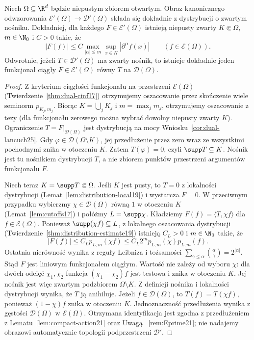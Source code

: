 \begin{twierdzenie}
\label{thm:compact-support-E25}
Niech $\Omega\subseteq\R^d$ będzie niepustym zbiorem otwartym.
Obraz kanonicznego odwzorowania
$\mathcal E'(\Omega)\to\mathcal D'(\Omega)$
składa się dokładnie z dystrybucji o zwartym nośniku.
Dokładniej, dla każdego $F\in\mathcal E'(\Omega)$ istnieją
niepusty zwarty $K\Subset\Omega$, $m\in\N_0$ i $C>0$ takie, że
\[
 |F(f)|\le C\max_{|\alpha|\le m}\sup_{x\in K}
 |\partial^\alpha f(x)|\qquad(f\in\mathcal E(\Omega)).
\]
Odwrotnie, jeżeli $T\in\mathcal D'(\Omega)$ ma zwarty nośnik,
to istnieje dokładnie jeden funkcjonał ciągły
$F\in\mathcal E'(\Omega)$ równy $T$ na $\mathcal D(\Omega)$.
\end{twierdzenie}
\begin{proof}
Z kryterium ciągłości funkcjonału na przestrzeni
$\mathcal E(\Omega)$ (Twierdzenie~\ref{thm:dual-cinf17})
otrzymujemy oszacowanie przez skończenie wiele
seminorm $p_{K_j,m_j}$. Biorąc $K=\bigcup_jK_j$
i $m=\max_jm_j$, otrzymujemy oszacowanie z tezy
(dla funkcjonału zerowego można wybrać dowolny
niepusty zwarty $K$). Ograniczenie
$T=F|_{\mathcal D(\Omega)}$ jest dystrybucją na mocy
Wniosku~\ref{cor:dual-lancuch25}. Gdy
$\varphi\in\mathcal D(\Omega\setminus K)$, jej
przedłużenie przez zero wraz ze wszystkimi pochodnymi
znika w otoczeniu $K$. Zatem $T(\varphi)=0$,
czyli $\supp T\subseteq K$.
Nośnik jest tu nośnikiem dystrybucji $T$,
a nie zbiorem punktów przestrzeni argumentów funkcjonału $F$.

Niech teraz $K=\supp T\Subset\Omega$. Jeśli $K$ jest
pusty, to $T=0$ z lokalności dystrybucji
(Lemat~\ref{lem:distribution-local19}) i wystarcza $F=0$.
W przeciwnym przypadku wybierzmy
$\chi\in\mathcal D(\Omega)$ równą $1$ w otoczeniu $K$
(Lemat~\ref{lem:cutoffs17}) i połóżmy $L=\supp\chi$.
Kładziemy $F(f)=\langle T,\chi f\rangle$ dla
$f\in\mathcal E(\Omega)$. Ponieważ $\supp(\chi f)\subseteq L$,
z lokalnego oszacowania dystrybucji
(Twierdzenie~\ref{thm:distribution-estimate19})
istnieją $C_L>0$ i $m\in\N_0$ takie, że
\[
 |F(f)|\le C_L p_{L,m}(\chi f)
 \le C_L 2^m p_{L,m}(\chi)p_{L,m}(f).
\]
Ostatnia nierówność wynika z reguły Leibniza i tożsamości
$\sum_{\gamma\le\alpha}\binom{\alpha}{\gamma}=2^{|\alpha|}$.
Stąd $F$ jest liniowym funkcjonałem ciągłym.
Wartość nie zależy od wyboru $\chi$: dla dwóch odcięć
$\chi_1,\chi_2$ funkcja $(\chi_1-\chi_2)f$ jest testowa
i znika w otoczeniu $K$. Jej nośnik jest więc zwartym
podzbiorem $\Omega\setminus K$. Z definicji nośnika
i lokalności dystrybucji wynika, że $T$ ją anihiluje. Jeżeli $f\in\mathcal D(\Omega)$, to
$T(f)=T(\chi f)$, ponieważ $(1-\chi)f$ znika w
otoczeniu $K$. Jednoznaczność przedłużenia wynika
z gęstości $\mathcal D(\Omega)$ w $\mathcal E(\Omega)$.
Otrzymana identyfikacja jest zgodna z przedłużeniem
z Lematu~\ref{lem:compact-action21} oraz Uwagą~
\ref{rem:Eprime21}; nie nadajemy obrazowi automatycznie
topologii podprzestrzeni $\mathcal D'$.
\end{proof}

